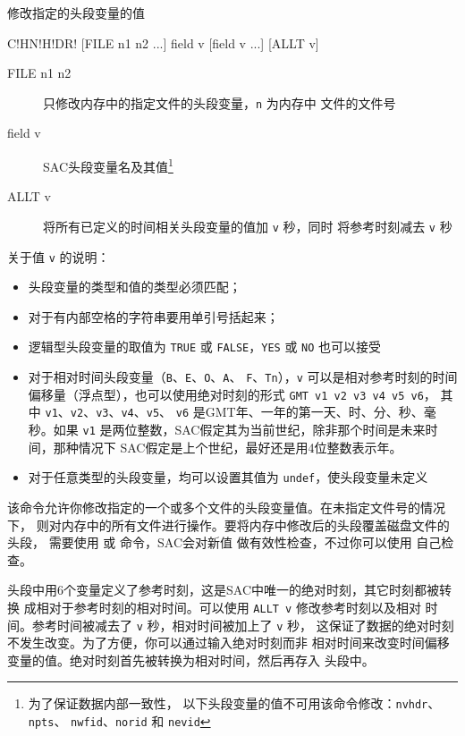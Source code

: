 \label{cmd:chnhdr}

修改指定的头段变量的值

\begin{SACSTX}
C!HN!H!DR! [FILE n1 n2 ...] field v [field v ...] [ALLT v]
\end{SACSTX}

\begin{description}
\item [FILE n1 n2] 只修改内存中的指定文件的头段变量，\texttt{n} 为内存中
    文件的文件号
\item [field v] SAC头段变量名及其值\footnote{为了保证数据内部一致性，
    以下头段变量的值不可用该命令修改：\texttt{nvhdr}、\texttt{npts}、
    \texttt{nwfid}、\texttt{norid} 和 \texttt{nevid}}
\item [ALLT v] 将所有已定义的时间相关头段变量的值加 \texttt{v} 秒，同时
    将参考时刻减去 \texttt{v} 秒
\end{description}

关于值 \texttt{v} 的说明：
\begin{itemize}
\item 头段变量的类型和值的类型必须匹配；
\item 对于有内部空格的字符串要用单引号括起来；
\item 逻辑型头段变量的取值为 \texttt{TRUE} 或 \texttt{FALSE}，\texttt{YES}
    或 \texttt{NO} 也可以接受
\item 对于相对时间头段变量（\texttt{B}、\texttt{E}、\texttt{O}、\texttt{A}、
    \texttt{F}、\texttt{Tn}），\texttt{v} 可以是相对参考时刻的时间
    偏移量（浮点型），也可以使用绝对时刻的形式 \texttt{GMT v1 v2 v3 v4 v5 v6}，
    其中 \texttt{v1}、\texttt{v2}、\texttt{v3}、\texttt{v4}、\texttt{v5}、
    \texttt{v6} 是GMT年、一年的第一天、时、分、秒、毫秒。如果 \texttt{v1}
    是两位整数，SAC假定其为当前世纪，除非那个时间是未来时间，那种情况下
    SAC假定是上个世纪，最好还是用4位整数表示年。
\item 对于任意类型的头段变量，均可以设置其值为 \texttt{undef}，使头段变量未定义
\end{itemize}

该命令允许你修改指定的一个或多个文件的头段变量值。在未指定文件号的情况下，
则对内存中的所有文件进行操作。要将内存中修改后的头段覆盖磁盘文件的头段，
需要使用  或  命令，SAC会对新值
做有效性检查，不过你可以使用  自己检查。

头段中用6个变量定义了参考时刻，这是SAC中唯一的绝对时刻，其它时刻都被转换
成相对于参考时刻的相对时间。可以使用 \texttt{ALLT v} 修改参考时刻以及相对
时间。参考时间被减去了 \texttt{v} 秒，相对时间被加上了 \texttt{v} 秒，
这保证了数据的绝对时刻不发生改变。为了方便，你可以通过输入绝对时刻而非
相对时间来改变时间偏移变量的值。绝对时刻首先被转换为相对时间，然后再存入
头段中。

